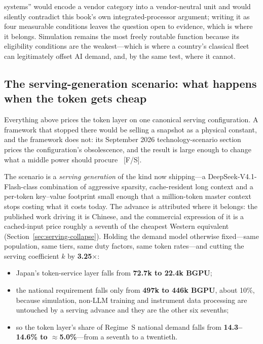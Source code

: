 systems'' would encode a vendor category into a vendor-neutral unit and would silently contradict this book's own integrated-processor argument; writing it as four measurable conditions leaves the question open to evidence, which is where it belongs. Simulation remains the most freely routable function because its eligibility conditions are the weakest---which is where a country's classical fleet can legitimately offset AI demand, and, by the same test, where it cannot.

\subsection{The serving-generation scenario: what happens when the token gets cheap}
\label{sec:serving-scenario}

Everything above prices the token layer on one canonical serving configuration. A framework that stopped there would be selling a snapshot as a physical constant, and the framework does not: its September 2026 technology-scenario section prices the configuration's obsolescence, and the result is large enough to change what a middle power should procure~\cite{ai4s-framework} [F/S].

The scenario is a \emph{serving generation} of the kind now shipping---a DeepSeek-V4.1-Flash-class combination of aggressive sparsity, cache-resident long context and a per-token key--value footprint small enough that a million-token master context stops costing what it costs today. The advance is attributed where it belongs: the published work driving it is Chinese, and the commercial expression of it is a cached-input price roughly a seventh of the cheapest Western equivalent (Section~\ref{sec:serving-collapse}). Holding the demand model otherwise fixed---same population, same tiers, same duty factors, same token rates---and cutting the serving coefficient $k$ by \textbf{3.25$\times$}:

\begin{itemize}\itemsep2pt
  \item Japan's token-service layer falls from \textbf{72.7k to 22.4k BGPU};
  \item the national requirement falls only from \textbf{497k to 446k BGPU}, about 10\%, because simulation, non-LLM training and instrument data processing are untouched by a serving advance and they are the other six sevenths;
  \item so the token layer's share of Regime~S national demand falls from \textbf{14.3--14.6\% to $\approx$5.0\%}---from a seventh to a twentieth.
\end{itemize}

